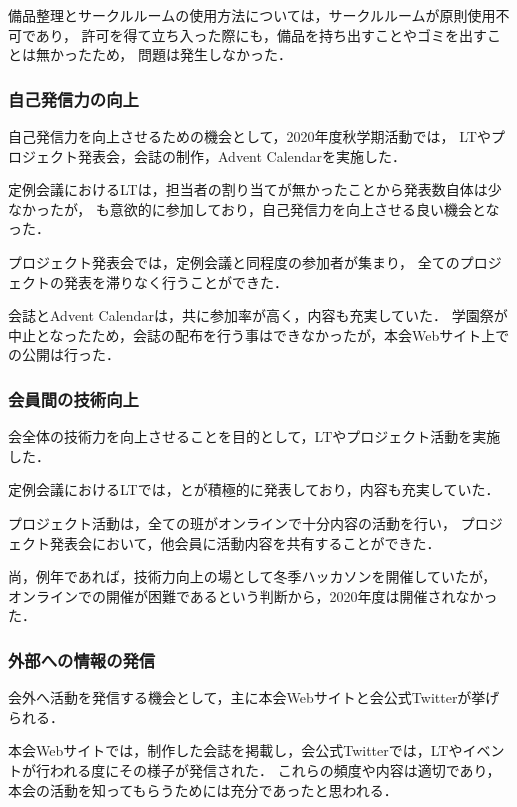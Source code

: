     備品整理とサークルルームの使用方法については，サークルルームが原則使用不可であり，
    許可を得て立ち入った際にも，備品を持ち出すことやゴミを出すことは無かったため，
    問題は発生しなかった．

\subsubsection*{自己発信力の向上}
    自己発信力を向上させるための機会として，2020年度秋学期活動では，
    LTやプロジェクト発表会，会誌の制作，Advent Calendarを実施した．

    定例会議におけるLTは，担当者の割り当てが無かったことから発表数自体は少なかったが，
    \firstGrade{}も意欲的に参加しており，自己発信力を向上させる良い機会となった．

    プロジェクト発表会では，定例会議と同程度の参加者が集まり，
    全てのプロジェクトの発表を滞りなく行うことができた．

    会誌とAdvent Calendarは，共に参加率が高く，内容も充実していた．
    学園祭が中止となったため，会誌の配布を行う事はできなかったが，本会Webサイト上での公開は行った．

\subsubsection*{会員間の技術向上}
    会全体の技術力を向上させることを目的として，LTやプロジェクト活動を実施した．

    定例会議におけるLTでは，\firstGrade{}と\secondGrade{}が積極的に発表しており，内容も充実していた．

    プロジェクト活動は，全ての班がオンラインで十分内容の活動を行い，
    プロジェクト発表会において，他会員に活動内容を共有することができた．

    尚，例年であれば，技術力向上の場として冬季ハッカソンを開催していたが，
    オンラインでの開催が困難であるという判断から，2020年度は開催されなかった．

\subsubsection*{外部への情報の発信}
    会外へ活動を発信する機会として，主に本会Webサイトと会公式Twitterが挙げられる．

    本会Webサイトでは，制作した会誌を掲載し，会公式Twitterでは，LTやイベントが行われる度にその様子が発信された．
    これらの頻度や内容は適切であり，本会の活動を知ってもらうためには充分であったと思われる．
